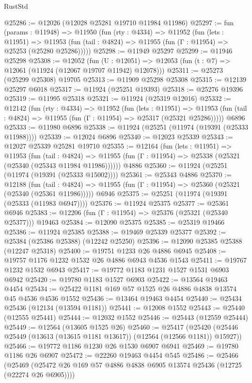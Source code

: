 \begin{lexlean}{RustStd}
\begin{coremodule}
@25286 := @12026 (@12028 @25281 @19710 @11984 @11986)
@25297 := fun (params : @11948) =>
  @11950
    (fun (rty : @4334) =>
    @11952
      (fun (lets : @11951) =>
      @11953 (fun (tail : @4824) => @11955 (fun (Γ : @11954) => @25253 (@25280 @25286)))))
@25298 := @11949 @25297
@25299 := @11946 @25298
@25308 := @12052
    (fun (U : @12051) => @12053 (fun (t : @7) => @12061 (@11924 (@12067 @19707 @11942) @12078)))
@25311 := @25273 (@25299 @25308) @19705
@25313 := @11909 @25298 @25308
@25315 := @12139 @25297 @6018
@25317 := @11924 (@25251 @19393)
@25318 := @25276 @19396
@25319 := @11995 @25318
@25321 := @11924 (@25319 @12016)
@25332 := @12142
    (fun (rty : @4334) =>
    @11952
      (fun (lets : @11951) =>
      @11953 (fun (tail : @4824) => @11955 (fun (Γ : @11954) => @25317 (@25321 @25286)))))
    @6896
@25333 := @11980 @6896
@25338 := @11924 (@25251 (@11974 (@19391 (@25333 @11988))))
@25339 := @12024 @6896
@25340 := @12023 @25339
@25343 := @12027 @25339 @25281 @19710
@25355 := @12164
    (fun (lets : @11951) =>
    @11953
      (fun (tail : @4824) =>
      @11955 (fun (Γ : @11954) => @25338 (@25321 (@25340 (@25343 @11984 @11986))))))
    @4886
@25360 := @11924 (@25251 (@11974 (@19391 (@25333 @15002))))
@25361 := @25343 @4886
@25370 := @12188
    (fun (tail : @4824) => @11955 (fun (Γ : @11954) => @25360 (@25321 (@25340 (@25361 @11986)))))
    @6946
@25375 := @25251 (@11974 (@19391 (@25333 (@11983 @6947))))
@25376 := @11924 @25375
@25377 := @25361 @6946
@25383 := @12206 (fun (Γ : @11954) => @25376 (@25321 (@25340 @25377))) @19463
@25384 := @12090 @25375
@25385 := @25319 @19466
@25386 := @11924 @25385
@25388 := @19469 @25339 @25377
@25392 := @25384 (@25386 @25388) (@12242 @25250)
@25396 := @12090 @25385 @25388 (@12247 @25318)
@25400 := @19751 @1233 @26 @4886 @6945
@25408 := @19757 @1176 @1232 @1532 @26 @4886 @6943 @4536 @1543
@25411 := @19767 @1232 @1532 @6943
@25417 := @19772 @1183 @1231 @1527 @1531 @6903 @6942
@25420 := @19780 @1183 @1527 @6903
@25422 := @13564 @19463 @4454
@25434 := @25422 @1181 @169 @57 @1525 @26 @4886 @4838 @13574 @45 @4536 @4536 @1552
@25436 := @13464 @19463 @4454
@25440 := @25434 @25436 (@12134 (@13594 @1181))
@25441 := @12008 @1552
@25443 := @25440 (@12555 @25441)
@25444 := @12032 @1552
@25446 := @25443 (@12559 @25444)
@25449 := @12564 (@13605 @1525 @26)
@25460 := @25417
    (@25420 (@25446 @25449 (@13613 (@13615 @1181 @13617)) (@12564 (@12566 @1181)) @15927))
@25466 := @19772 @1186 @1230 @26 @1530 @6907 @6941
@25469 := @19780 @1186 @26 @6907
@25472 := @22260 @19463 @4454 @545
@25486 := @25466
    (@25469 (@25472 @26 @169 @57 @4886 @4838 @6905 @13574 @25436 (@12725 (@22274 @26 @6905))))

\end{coremodule}
\end{lexlean}
